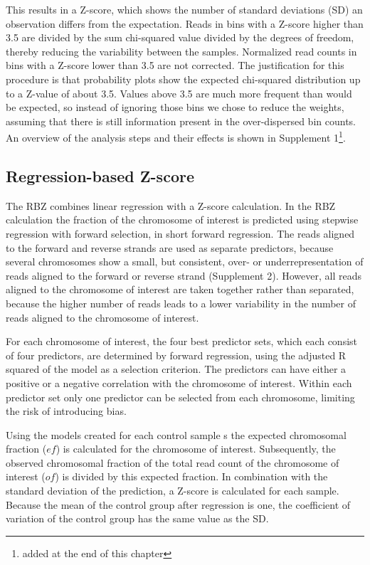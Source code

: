\noindent This results in a Z-score, which shows the number of standard deviations (SD) an observation differs from the expectation. 
Reads in bins with a Z-score higher than 3.5 are divided by the sum chi-squared value divided by the degrees of freedom, thereby reducing the variability between the samples. 
Normalized read counts in bins with a Z-score lower than 3.5 are not corrected. 
The justification for this procedure is that probability plots show the expected chi-squared distribution up to a Z-value of about 3.5. 
Values above 3.5 are much more frequent than would be expected, so instead of ignoring those bins we chose to reduce the weights, assuming that there is still information present in the over-dispersed bin counts. 
An overview of the analysis steps and their effects is shown in Supplement 1\footnote{added at the end of this chapter}.

\subsection{Regression-based Z-score}
The RBZ combines linear regression with a Z-score calculation. 
In the RBZ calculation the fraction of the chromosome of interest is predicted using stepwise regression with forward selection, in short forward regression. 
The reads aligned to the forward and reverse strands are used as separate predictors, because several chromosomes show a small, but consistent, over- or underrepresentation of reads aligned to the forward or reverse strand (Supplement 2). 
However, all reads aligned to the chromosome of interest are taken together rather than separated, because the higher number of reads leads to a lower variability in the number of reads aligned to the chromosome of interest.

For each chromosome of interest, the four best predictor sets, which each consist of four predictors, are determined by forward regression, using the adjusted R squared of the model as a selection criterion. 
The predictors can have either a positive or a negative correlation with the chromosome of interest. 
Within each predictor set only one predictor can be selected from each chromosome, limiting the risk of introducing bias.

Using the models created for each control sample s the expected chromosomal fraction ($ef$) is calculated for the chromosome of interest. 
Subsequently, the observed chromosomal fraction of the total read count of the chromosome of interest ($of$) is divided by this expected fraction. 
In combination with the standard deviation of the prediction, a Z-score is calculated for each sample. 
Because the mean of the control group after regression is one, the coefficient of variation of the control group has the same value as the SD.

